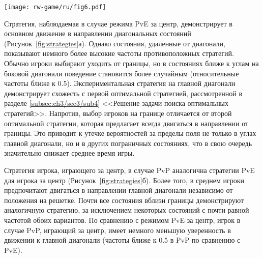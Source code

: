 \begin{figure*}[!ht]
    \centering
    \texttt{[image: rw-game/ru/fig6.pdf]}
    \caption{
        Визуализация средних популяционных стратегий для разных режимов, полученных в эксперименте. Цвет ячеек отображает частоту выбора первой чистой стратегии: для игры за центр (а, б, в) и для игры за границу (г, д, е)
    }  
    \label{fig:strategies}
    
\end{figure*}

Стратегия, наблюдаемая в случае режима PvE за центр, демонстрирует в основном движение в направлении диагональных состояний (Рисунок~\cref{fig:strategies}а). Однако состояния, удаленные от диагонали, показывают немного более высокие частоты противоположных стратегий. Обычно игроки выбирают уходить от границы, но в состояниях ближе к углам на боковой диагонали поведение становится более случайным (относительные частоты ближе к $0.5$). Экспериментальная стратегия на главной диагонали демонстрирует схожесть с первой оптимальной стратегией, рассмотренной в разделе \cref{subsec:ch3/sec3/sub4} <<Решение задачи поиска оптимальных стратегий>>. Напротив, выбор игроков на границе отличается от второй оптимальной стратегии, которая предлагает всегда двигаться в направлении от границы. Это приводит к утечке вероятностей за пределы поля не только в углах главной диагонали, но и в других пограничных состояниях, что в свою очередь значительно снижает среднее время игры. 

Стратегия игрока, играющего за центр, в случае PvP аналогична стратегии PvE для игрока за центр (Рисунок~\cref{fig:strategies}б). Более того, в среднем игроки предпочитают двигаться в направлении главной диагонали независимо от положения на решетке. Почти все состояния вблизи границы демонстрируют аналогичную стратегию, за исключением некоторых состояний с почти равной частотой обоих вариантов. По сравнению с режимом PvE за центр, игрок в случае PvP, играющий за центр, имеет немного меньшую уверенность в движении к главной диагонали (частоты ближе к $0.5$ в PvP по сравнению с PvE).

